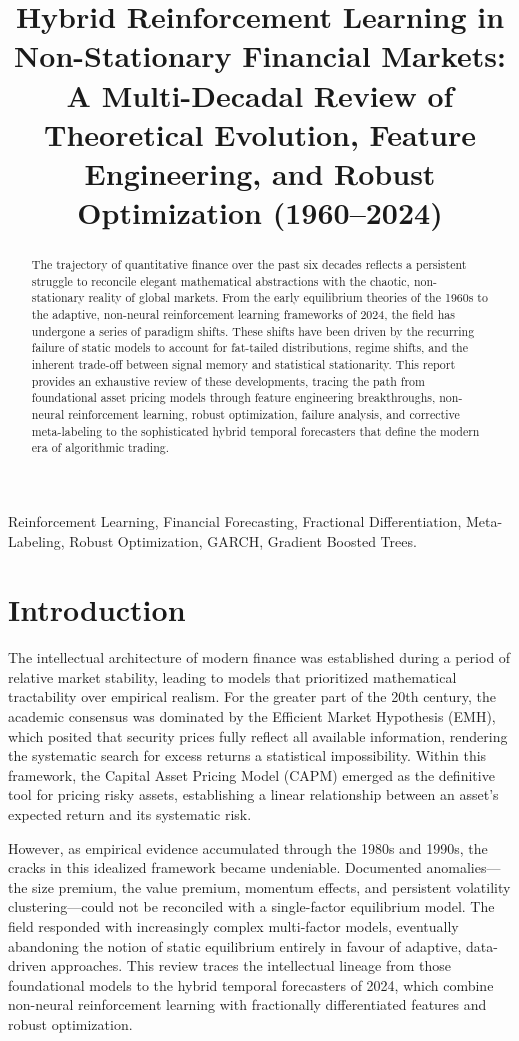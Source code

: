 \documentclass[conference]{IEEEtran}
\title{Hybrid Reinforcement Learning in Non-Stationary Financial Markets: A Multi-Decadal Review of Theoretical Evolution, Feature Engineering, and Robust Optimization (1960--2024)}
\author{
\IEEEauthorblockN{Vaiditya Tanwar}
\IEEEauthorblockA{School of Technology \\
Rishihood University \\
Sonipat, India \\
EN No: 230086 \\
vaiditya.t23csai@nst.rishihood.edu.in}
\and
\IEEEauthorblockN{Yashi Gupta}
\IEEEauthorblockA{School of Technology \\
Rishihood University \\
Sonipat, India \\
EN No: 230072 \\
yashi.g23csai@nst.rishihood.edu.in}
}
\begin{document}
\maketitle

\begin{abstract}
The trajectory of quantitative finance over the past six decades reflects a persistent struggle to reconcile elegant mathematical abstractions with the chaotic, non-stationary reality of global markets. From the early equilibrium theories of the 1960s to the adaptive, non-neural reinforcement learning frameworks of 2024, the field has undergone a series of paradigm shifts. These shifts have been driven by the recurring failure of static models to account for fat-tailed distributions, regime shifts, and the inherent trade-off between signal memory and statistical stationarity. This report provides an exhaustive review of these developments, tracing the path from foundational asset pricing models through feature engineering breakthroughs, non-neural reinforcement learning, robust optimization, failure analysis, and corrective meta-labeling to the sophisticated hybrid temporal forecasters that define the modern era of algorithmic trading.
\end{abstract}

\begin{IEEEkeywords}
Reinforcement Learning, Financial Forecasting, Fractional Differentiation, Meta-Labeling, Robust Optimization, GARCH, Gradient Boosted Trees.
\end{IEEEkeywords}

\section{Introduction}
The intellectual architecture of modern finance was established during a period of relative market stability, leading to models that prioritized mathematical tractability over empirical realism. For the greater part of the 20th century, the academic consensus was dominated by the Efficient Market Hypothesis (EMH), which posited that security prices fully reflect all available information, rendering the systematic search for excess returns a statistical impossibility. Within this framework, the Capital Asset Pricing Model (CAPM) emerged as the definitive tool for pricing risky assets, establishing a linear relationship between an asset's expected return and its systematic risk.

However, as empirical evidence accumulated through the 1980s and 1990s, the cracks in this idealized framework became undeniable. Documented anomalies---the size premium, the value premium, momentum effects, and persistent volatility clustering---could not be reconciled with a single-factor equilibrium model. The field responded with increasingly complex multi-factor models, eventually abandoning the notion of static equilibrium entirely in favour of adaptive, data-driven approaches. This review traces the intellectual lineage from those foundational models to the hybrid temporal forecasters of 2024, which combine non-neural reinforcement learning with fractionally differentiated features and robust optimization.
\end{document}
